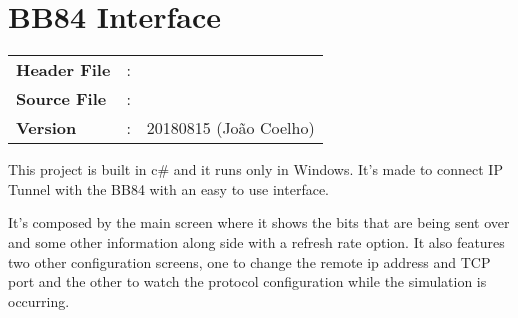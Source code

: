 \clearpage

\section{BB84 Interface}

\begin{tcolorbox}	
	\begin{tabular}{p{2.75cm} p{0.2cm} p{10.5cm}} 	
		\textbf{Header File}   &:&  \\
		\textbf{Source File}   &:&  \\
        \textbf{Version}       &:& 20180815 (Jo\~ao Coelho) \\
	\end{tabular}
\end{tcolorbox}

This project is built in c# and it runs only in Windows. It's made to connect IP Tunnel with the BB84 with an easy to use interface.
\par
It's composed by the main screen where it shows the bits that are being sent over and some other information along side with a refresh rate option. It also features two other configuration screens, one to change the remote ip address and TCP port and the other to watch the protocol configuration while the simulation is occurring.

